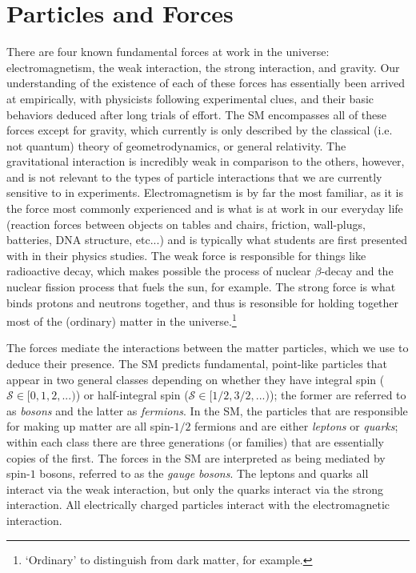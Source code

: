 \section{Particles and Forces}
\label{sec:sm_description}

There are four known fundamental forces at work in the universe: electromagnetism,
the weak interaction, the strong interaction, and gravity.
Our understanding of the existence of each of these forces
has essentially been arrived at empirically, with physicists following experimental
clues, and their basic behaviors deduced after long trials of effort.
The SM encompasses all of these forces except for gravity, which currently
is only described by the classical (i.e. not quantum) theory of geometrodynamics, or general
relativity.
The gravitational interaction is incredibly weak in comparison to the others, however, and
is not relevant to the types of particle interactions that we are currently
sensitive to in experiments.
Electromagnetism is by far the most familiar, as it is the force
most commonly experienced and is what is at work in our everyday life (reaction forces between
objects on tables and chairs, friction, wall-plugs, batteries, DNA structure, etc...) and is typically what
students are first presented with in their physics studies.
The weak force is responsible for things like radioactive decay,
which makes possible the process of nuclear $\beta$-decay and the nuclear
fission process that fuels the sun, for example. The strong force is what binds protons
and neutrons together, and thus is resonsible for holding together most of the (ordinary) matter
in the universe.\footnote{`Ordinary' to distinguish from dark matter, for example.}

The forces mediate the interactions between the matter particles, which we use to deduce
their presence. The SM predicts fundamental, point-like particles that appear in two
general classes depending on whether they have integral spin ($\mathcal{S} \in [0,1,2,...)$) or half-integral
spin ($\mathcal{S} \in [1/2, 3/2, ...)$); the former are referred to as \textit{bosons} and the
latter as \textit{fermions}.
In the SM, the particles that are responsible for making up matter are all spin-$1/2$ fermions
and are either \textit{leptons} or \textit{quarks}; within each class
there are three generations (or families) that are essentially copies of the first.
The forces in the SM are interpreted as being mediated by spin-$1$ bosons, referred to as the 
\textit{gauge bosons}.
The leptons and quarks all interact via the weak interaction, but only the quarks interact
via the strong interaction. All electrically charged particles interact with the electromagnetic
interaction.

